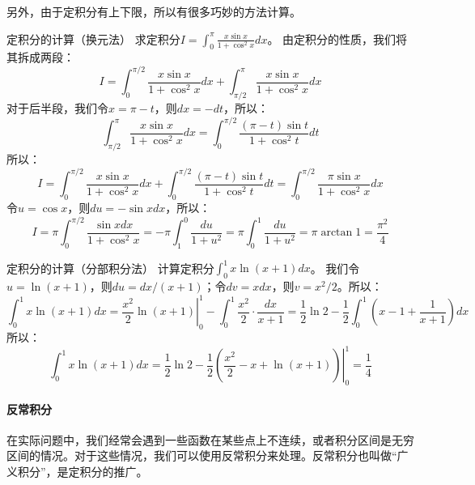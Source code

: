 另外，由于定积分有上下限，所以有很多巧妙的方法计算。

\begin{example}{定积分的计算（换元法）}{}
    求定积分$I= \int_{0}^{\pi} \frac{x\sin x}{1 + \cos^2 x} dx$。
    \tcblower
    由定积分的性质，我们将其拆成两段：
    \begin{equation}
        I= \int_{0}^{\pi/2} \frac{x\sin x}{1 + \cos^2 x} dx + \int_{\pi/2}^{\pi} \frac{x\sin x}{1 + \cos^2 x} dx
    \end{equation}
    对于后半段，我们令$x = \pi - t$，则$dx = -dt$，所以：
    \begin{equation}
        \int_{\pi/2}^{\pi} \frac{x\sin x}{1 + \cos^2 x} dx = \int_{0}^{\pi/2} \frac{(\pi - t)\sin t}{1 + \cos^2 t} dt
    \end{equation}
    所以：
    \begin{equation}
        I= \int_{0}^{\pi/2} \frac{x\sin x}{1 + \cos^2 x} dx + \int_{0}^{\pi/2} \frac{(\pi - t)\sin t}{1 + \cos^2 t} dt
        = \int_{0}^{\pi/2} \frac{\pi \sin x}{1 + \cos^2 x} dx
    \end{equation}
    令$u = \cos x$，则$du = -\sin x dx$，所以：
    \begin{equation}
        I= \pi \int_{0}^{\pi/2} \frac{\sin x dx}{1 + \cos^2 x} = -\pi \int_{1}^{0} \frac{du}{1 + u^2} = \pi \int_{0}^{1} \frac{du}{1 + u^2} = \pi \arctan 1 = \frac{\pi^2}{4}
    \end{equation}
\end{example}

\begin{example}{定积分的计算（分部积分法）}{}
    计算定积分$\int_0^1 x \ln(x+1) dx$。
    \tcblower
    我们令$u = \ln(x+1)$，则$du = dx/(x+1)$；令$dv = x dx$，则$v = x^2/2$。所以：
    \begin{equation}
        \int_0^1 x \ln(x+1) dx = \left. \frac{x^2}{2} \ln(x+1) \right|_0^1 - \int_0^1 \frac{x^2}{2} \cdot \frac{dx}{x+1} = \frac{1}{2} \ln 2 - \frac{1}{2} \int_0^1 (x - 1 + \frac{1}{x+1}) dx
    \end{equation}
    所以：
    \begin{equation}
        \int_0^1 x \ln(x+1) dx = \frac{1}{2} \ln 2 - \frac{1}{2} \left.\left(  \frac{x^2}{2} - x + \ln(x+1)  \right)\right|_0^1 = \frac{1}{4}
    \end{equation}
\end{example}

\paragraph{反常积分} 在实际问题中，我们经常会遇到一些函数在某些点上不连续，或者积分区间是无穷区间的情况。对于这些情况，我们可以使用反常积分来处理。反常积分也叫做“广义积分”，是定积分的推广。

